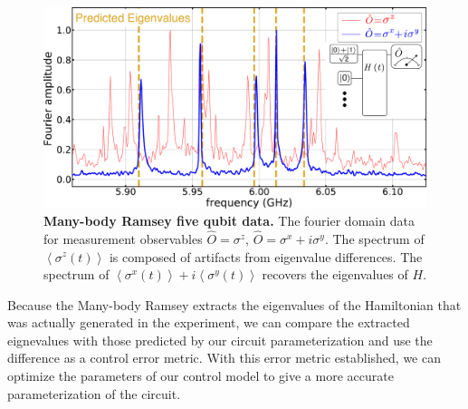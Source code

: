\begin{figure}[h]
    \begin{center}
        \includegraphics[width=150 mm]{./PDF/mbr_peaks_5q_data_191016_1057a.pdf}
    \end{center}
    \caption{\textbf{Many-body Ramsey five qubit data.}
    The fourier domain data for measurement observables
    $\hat{O}=\sigma^z$, $\hat{O}=\sigma^x + i \sigma^y$.
    The spectrum of $\left< \sigma^z (t) \right>$ is composed of artifacts from eigenvalue differences.
    The spectrum of $\left< \sigma^x (t) \right> + i \left< \sigma^y (t) \right>$ recovers the eigenvalues of $H$.
    }
    \label{mbr_peaks_data}
\end{figure}
Because the Many-body Ramsey extracts the eigenvalues of the Hamiltonian that was actually generated in the experiment,
we can compare the extracted eignevalues with those predicted by our circuit parameterization and use the difference as a control error metric.
With this error metric established, we can optimize the parameters of our control model to give a more accurate parameterization of the circuit.

